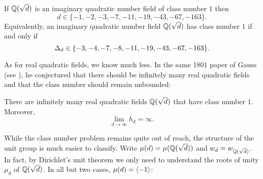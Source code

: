     \begin{theorem}
      If $\mathbb{Q}(\sqrt{d})$ is an imaginary quadratic number field of class number $1$ then
      \[
        d \in \{-1,-2,-3,-7,-11,-19,-43,-67,-163\}.
      \]
      Equivalently, an imaginary quadratic number field $\mathbb{Q}(\sqrt{d})$ has class number $1$ if and only if
      \[
        \Delta_{d} \in \{-3,-4,-7,-8,-11,-19,-43,-67,-163\}.
      \]
    \end{theorem}

    As for real quadratic fields, we know much less. In the same 1801 paper of Gauss (see \cite{gauss1801disquisitiones}), he conjectured that there should be infinitely many real quadratic fields and that the class number should remain unbounded:

    \begin{conjecture}
      There are infinitely many real quadratic fields $\mathbb{Q}(\sqrt{d})$ that have class number $1$. Moreover,
      \[
        \lim_{d \to \infty}h_{d} = \infty.
      \]
    \end{conjecture}

    While the class number problem remains quite out of reach, the structure of the unit group is much easier to classify. Write $\mu(d) = \mu(\mathbb{Q}(\sqrt{d}))$ and $w_{d} = w_{\mathbb{Q}(\sqrt{d})}$. In fact, by Dirichlet's unit theorem we only need to understand the roots of unity $\mu_{d}$ of $\mathbb{Q}(\sqrt{d})$. In all but two cases, $\mu(d) = \langle-1\rangle$:

